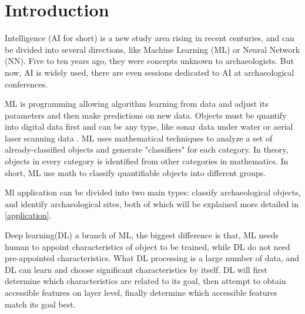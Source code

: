 \documentclass[journal]{IEEEtran}
\begin{document}
	
	
	\section{Introduction}
	 Intelligence (AI for short) is a new study area rising in recent centuries, and can be divided into several directions, like Machine Learning (ML) or Neural Network (NN). Five to ten years ago, they were concepts unknown to archaeologists. But now, AI is widely used, there are even sessions dedicated to AI at archaeological conferences.\cite{heritage4010008}
	
	ML is programming allowing algorithm learning from data and adjust its parameters and then make predictions on new data. Objects must be quantify into digital data first and can be any type, like sonar data under water\cite{Drap2018UnderwaterPF} or aerial
	laser scanning data \cite{rs10020225}. ML uses mathematical techniques to analyze a set of already-classified objects and generate "classifiers" for each category. In theory, objects in every category is identified from other categories in mathematics. In short, ML use math to classify quantifiable objects into different groups.\cite{bickler_2021}
	
	Ml application can be divided into two main types: classify archaeological objects, and identify archaeological sites, both of which will be explained more detailed in \ref{application}. 
	
	Deep learning(DL) a branch of ML, the biggest difference is that, ML needs human to appoint characteristics of object to be trained, while DL do not need pre-appointed characteristics. What DL processing is a large number of data, and DL can learn and choose significant characteristics by itself. DL will first determine which characteristics are related to its goal, then attempt to obtain accessible features on layer level, finally determine which accessible features match its goal best.
	
\end{document}

